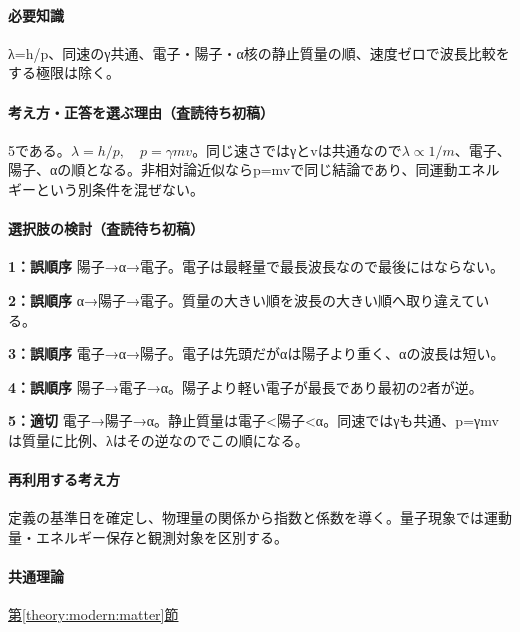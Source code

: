 \paragraph{必要知識} λ=h/p、同速のγ共通、電子・陽子・α核の静止質量の順、速度ゼロで波長比較をする極限は除く。

\paragraph{考え方・正答を選ぶ理由（査読待ち初稿）} 5である。\(\lambda=h/p,\quad p=\gamma mv\)。同じ速さではγとvは共通なので\(\lambda\propto1/m\)、電子、陽子、αの順となる。非相対論近似ならp=\allowbreak{}mvで同じ結論であり、同運動エネルギーという別条件を混ぜない。

\paragraph{選択肢の検討（査読待ち初稿）}\mbox{}\par

\noindent\textbf{1：誤順序} 陽子→α→電子。電子は最軽量で最長波長なので最後にはならない。\par

\noindent\textbf{2：誤順序} α→陽子→電子。質量の大きい順を波長の大きい順へ取り違えている。\par

\noindent\textbf{3：誤順序} 電子→α→陽子。電子は先頭だがαは陽子より重く、αの波長は短い。\par

\noindent\textbf{4：誤順序} 陽子→電子→α。陽子より軽い電子が最長であり最初の2者が逆。\par

\noindent\textbf{5：適切} 電子→陽子→α。静止質量は電子<陽子<α。同速ではγも共通、p=γmvは質量に比例、λはその逆なのでこの順になる。\par

\paragraph{再利用する考え方} 定義の基準日を確定し、物理量の関係から指数と係数を導く。量子現象では運動量・エネルギー保存と観測対象を区別する。

\paragraph{共通理論} \hyperref[theory:modern:matter]{第\ref*{theory:modern:matter}節}

